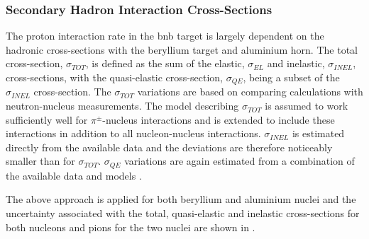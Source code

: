 \subsubsection*{Secondary Hadron Interaction Cross-Sections}
The proton interaction rate in the \gls{bnb} target is largely dependent on the hadronic cross-sections with the beryllium target and aluminium horn. %
The total cross-section, $\sigma_{TOT}$, is defined as the sum of the elastic, $\sigma_{EL}$ and inelastic, $\sigma_{INEL}$, cross-sections, with the quasi-elastic cross-section, $\sigma_{QE}$, being a subset of the  $\sigma_{INEL}$ cross-section. The $\sigma_{TOT}$ variations are based on comparing calculations with neutron-nucleus measurements. The model describing $\sigma_{TOT}$ is assumed to work sufficiently well for $\pi^{\pm}$-nucleus interactions and is extended to include these interactions in addition to all nucleon-nucleus interactions. $\sigma_{INEL}$ is estimated directly from the available data and the deviations are therefore noticeably smaller than for $\sigma_{TOT}$. %
$\sigma_{QE}$ variations are again estimated from a combination of the available data and models \cite{BNB_flux}. %

The above approach is applied for both beryllium and aluminium nuclei and the uncertainty associated with the total, quasi-elastic and inelastic cross-sections for both nucleons and pions for the two nuclei are shown in .

